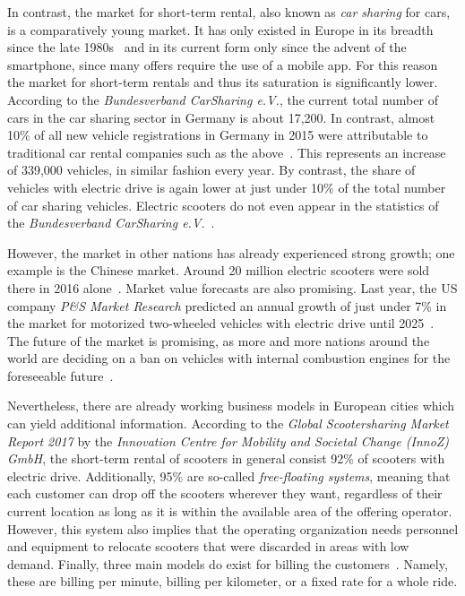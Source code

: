 \documentclass[12pt,a4paper]{report}
\begin{document}
In contrast, the market for short-term rental, also known as \textit{car sharing} for cars,
is a comparatively young market. It has only existed in Europe in its breadth
since the late 1980s~\cite{history-of-carsharing} and in its current form
only since the advent of the smartphone, since many offers require the use of a mobile app.
For this reason the market for short-term rentals and thus its saturation is significantly lower.
According to the \textit{Bundesverband CarSharing e.V.}, the current total number of cars
in the car sharing sector in Germany is about 17,200. In contrast, almost 10\% of all
new vehicle registrations in Germany in 2015 were attributable to traditional
car rental companies such as the above~\cite{sparkasse-kfz-vermietung}.
This represents an increase of 339,000 vehicles, in similar fashion every year.
By contrast, the share of vehicles with electric drive is again lower at
just under 10\% of the total number of car sharing vehicles.
Electric scooters do not even appear in the statistics of the
\textit{Bundesverband CarSharing e.V.}~\cite{bundesverband-carsharing-statistics}.

However, the market in other nations has already experienced strong growth;
one example is the Chinese market. Around 20 million electric scooters were sold
there in 2016 alone~\cite{heise-electric-scooters}. Market value forecasts are also promising.
Last year, the US company \textit{P\&S Market Research} predicted an annual growth of
just under 7\% in the market for motorized two-wheeled vehicles with
electric drive until 2025~\cite{pands-electric-scooters}.
The future of the market is promising, as more and more nations around the world
are deciding on a ban on vehicles with internal combustion engines for the
foreseeable future~\cite{faz-combustion-engine-ban}.

Nevertheless, there are already working business models in European cities
which can yield additional information.
According to the \textit{Global Scootersharing Market Report 2017} by the
\textit{Innovation Centre for Mobility and Societal Change (InnoZ) GmbH},
the short-term rental of scooters in general consist 92\% of scooters with
electric drive. Additionally, 95\% are so-called \textit{free-floating systems},
meaning that each customer can drop off the scooters wherever they want, regardless
of their current location as long as it is within the available area of the offering operator.
However, this system also implies that the operating organization needs personnel
and equipment to relocate scooters that were discarded in areas with low demand.
Finally, three main models do exist for billing the customers~\cn.
Namely, these are billing per minute, billing per kilometer, or a fixed rate for a whole ride.
\end{document}
